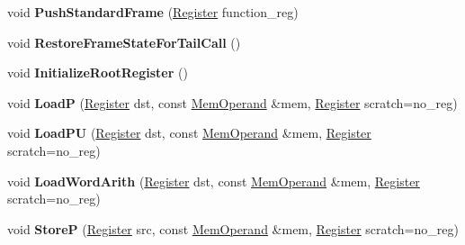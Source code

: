 \begin{DoxyCompactItemize}
void {\bfseries Push\+Standard\+Frame} (\mbox{\hyperlink{classv8_1_1internal_1_1Register}{Register}} function\+\_\+reg)
\item 
\mbox{\label{classv8_1_1internal_1_1TurboAssembler_a2c0925acdb12fd00b5ca3fe291b77339}} 
void {\bfseries Restore\+Frame\+State\+For\+Tail\+Call} ()
\item 
\mbox{\label{classv8_1_1internal_1_1TurboAssembler_a919c742613dc1bcf65b76c2c8dddde57}} 
void {\bfseries Initialize\+Root\+Register} ()
\item 
\mbox{\label{classv8_1_1internal_1_1TurboAssembler_a2d20c70cc394d02e66db6fe42af7758d}} 
void {\bfseries LoadP} (\mbox{\hyperlink{classv8_1_1internal_1_1Register}{Register}} dst, const \mbox{\hyperlink{classv8_1_1internal_1_1MemOperand}{Mem\+Operand}} \&mem, \mbox{\hyperlink{classv8_1_1internal_1_1Register}{Register}} scratch=no\+\_\+reg)
\item 
\mbox{\label{classv8_1_1internal_1_1TurboAssembler_a9c31797cd324bced0ba4cef0fd80f219}} 
void {\bfseries Load\+PU} (\mbox{\hyperlink{classv8_1_1internal_1_1Register}{Register}} dst, const \mbox{\hyperlink{classv8_1_1internal_1_1MemOperand}{Mem\+Operand}} \&mem, \mbox{\hyperlink{classv8_1_1internal_1_1Register}{Register}} scratch=no\+\_\+reg)
\item 
\mbox{\label{classv8_1_1internal_1_1TurboAssembler_a874c581345680a2cdcdc6345715f4d89}} 
void {\bfseries Load\+Word\+Arith} (\mbox{\hyperlink{classv8_1_1internal_1_1Register}{Register}} dst, const \mbox{\hyperlink{classv8_1_1internal_1_1MemOperand}{Mem\+Operand}} \&mem, \mbox{\hyperlink{classv8_1_1internal_1_1Register}{Register}} scratch=no\+\_\+reg)
\item 
\mbox{\label{classv8_1_1internal_1_1TurboAssembler_a88112e76e2848972bca2336bf475cd0d}} 
void {\bfseries StoreP} (\mbox{\hyperlink{classv8_1_1internal_1_1Register}{Register}} src, const \mbox{\hyperlink{classv8_1_1internal_1_1MemOperand}{Mem\+Operand}} \&mem, \mbox{\hyperlink{classv8_1_1internal_1_1Register}{Register}} scratch=no\+\_\+reg)
\item 

\end{DoxyCompactItemize}
